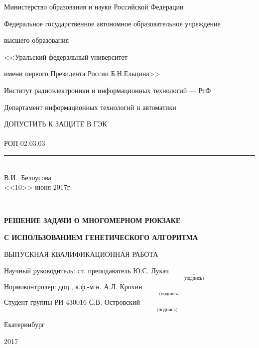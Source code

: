 \begin{titlepage}
{\small
\centerline{Министерство образования и науки Российской Федерации}
\centerline{Федеральное государственное автономное образовательное учреждение}
\centerline{высшего образования}
\centerline{\normalsize<<Уральский федеральный университет}
\centerline{\normalsize имени первого Президента России Б.Н.Ельцина>>}
\vskip0.2cm
\centerline{\normalsize Институт радиоэлектроники и информационных технологий --- РтФ}
\vskip0.2cm\centerline{\normalsize Департамент информационных технологий и автоматики}
}
\vskip1cm

\null\hfill
\begin{minipage}{0.6\textwidth}
\hfill ДОПУСТИТЬ К ЗАЩИТЕ В ГЭК \\ \\
РОП 02.03.03\rule[-1pt]{3.5cm}{0.4pt}
\\\phantom{XXXXXXXXXXXXXXXXXXX} В.И.~Белоусова
\\%
\hfill <<10>> июня  2017г.
\end{minipage}\\
\vskip2cm
\centerline{\bf РЕШЕНИЕ ЗАДАЧИ О 
	МНОГОМЕРНОМ РЮКЗАКЕ
}
\centerline{\bf	
	 С ИСПОЛЬЗОВАНИЕМ ГЕНЕТИЧЕСКОГО АЛГОРИТМА
}
\vskip0.2cm
\centerline{{ВЫПУСКНАЯ КВАЛИФИКАЦИОННАЯ РАБОТА}}

\vskip5.5cm
\noindent
Научный руководитель: ст. преподаватель Ю.С. Лукач\hfill $\underset{\text{(подпись)}}{\underline{\hspace{3cm}}}$\\
\vskip0.2cm
Нормоконтролер: доц., к.ф.-м.н. А.Л. Крохин \hfill $\underset{\text{(подпись)}}{\underline{\hspace{3cm}}}$\\
\vskip0.2cm
Студент группы  РИ-430016 С.В. Островский \hfill $\underset{\text{(подпись)}}{\underline{\hspace{3cm}}}$\\
\vfill
\centerline{Екатеринбург}
\centerline{2017}
\end{titlepage}